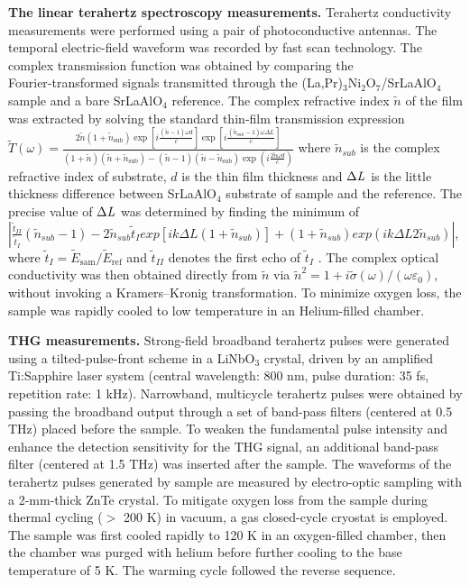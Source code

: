 \documentclass{nature}
\begin{document}
\begin{sloppypar}
\textbf{The linear terahertz spectroscopy measurements.} Terahertz conductivity measurements were performed using a pair of photoconductive antennas. The temporal electric-field waveform was recorded by fast scan technology. The complex transmission function was obtained by comparing the Fourier‑transformed signals transmitted through the (La,Pr)$_3$Ni$_2$O$_7$/SrLaAlO$_4$ sample and a bare SrLaAlO$_4$ reference. The complex refractive index $\tilde{n}$ of the film was extracted by solving the standard thin‑film transmission expression  $\tilde{T}(\omega) = \frac{2\tilde{n}(1+\tilde{n}_{\text{sub}}) \exp\left[i\frac{(\tilde{n}-1)\omega d}{c}\right] \exp\left[i\frac{(\tilde{n}_{\text{sub}}-1)\omega \Delta L}{c}\right]}{(1+\tilde{n})(\tilde{n}+\tilde{n}_{\text{sub}})-(\tilde{n}-1)(\tilde{n}-\tilde{n}_{\text{sub}})\exp\left(i\frac{2\tilde{n}\omega d}{c}\right)} $ where $\tilde{n}_{sub}$ is the complex refractive index of substrate, $d$ is the thin film thickness and $\Delta\it{L}$ is the little thickness difference between SrLaAlO$ _{4} $ substrate of sample and the reference. The precise value of $\Delta\it{L}$ was determined by finding the minimum of $\left|\frac{\tilde{t}_{II}}{\tilde{t}_{I}}(\tilde{n}_{sub}-1)-2\tilde{n}_{sub}\tilde{t}_{I}exp[ik\Delta L(1+\tilde{n}_{sub})]+(1+\tilde{n}_{sub})exp(ik\Delta L2\tilde{n}_{sub}) \right|$, where $\tilde{t}_{I}=\tilde{E}_{\mathrm{sam}}/\tilde{E}_{\mathrm{ref}}$ and $\tilde{t}_{II}$ denotes the first echo of $\tilde{t}_{I}$ \cite{Krewer2018}. The complex optical conductivity was then obtained directly from $\tilde{n}$ via $\tilde{n}^{2}=1+i\tilde{\sigma}(\omega)/(\omega\varepsilon_{0})$, without invoking a Kramers–Kronig transformation. To minimize oxygen loss, the sample was rapidly cooled to low temperature in an Helium-filled chamber.
\end{sloppypar}


\textbf{THG measurements.} Strong-field broadband terahertz pulses were generated using a tilted-pulse-front scheme in a LiNbO$ _{3} $ crystal, driven by an amplified Ti:Sapphire laser system (central wavelength: 800 nm, pulse duration: 35 fs, repetition rate: 1 kHz). Narrowband, multicycle terahertz pulses were obtained by passing the broadband output through a set of band-pass filters (centered at 0.5 THz) placed before the sample. To weaken the fundamental pulse intensity and enhance the detection sensitivity for the THG signal, an additional band-pass filter (centered at 1.5 THz) was inserted after the sample. The waveforms of the terahertz pulses generated by sample are measured by electro-optic sampling with a 2-mm-thick ZnTe crystal. To mitigate oxygen loss from the sample during thermal cycling ($>$ 200 K) in vacuum, a gas closed-cycle cryostat is employed. The sample was first cooled rapidly to 120 K in an oxygen-filled chamber, then the chamber was purged with helium before further cooling to the base temperature of 5 K. The warming cycle followed the reverse sequence. 
\end{document}
